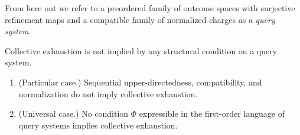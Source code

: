 \noindent From here out we refer to a preordered family of outcome spaces with surjective
refinement maps and a compatible family of normalized charges as a \emph{query system}.

\begin{proposition}[CE irreducibility]
\label{prop:ce-irreducibility}
Collective exhaustion is not implied by any structural condition on a query system.
\begin{enumerate}[label=(\roman*)]
  \item \textup{(Particular case.)}  Sequential upper-directedness, compatibility,
        and normalization do not imply collective exhaustion.
  \item \textup{(Universal case.)}  No condition $\Phi$ expressible in the
        first-order language of query systems implies collective exhaustion.
\end{enumerate}
\end{proposition}

